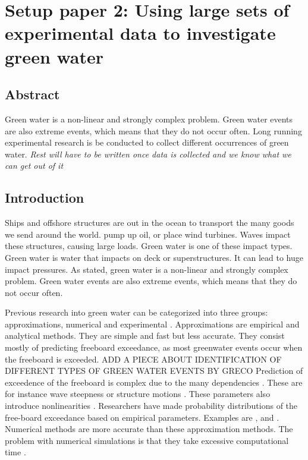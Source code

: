 \chapter{Setup paper 2: Using large sets of experimental data to investigate green water}
\label{sec:setup2}
\section*{Abstract}
Green water is a non-linear and strongly complex problem. Green water events are also extreme events, which means that they do not occur often. Long running experimental research is be conducted to collect different occurrences of green water. \textit{Rest will have to be written once data is collected and we know what we can get out of it}
\section{Introduction}
\label{sec:setup2_intro}
Ships and offshore structures are out in the ocean to transport the many goods we send around the world. pump up oil, or place wind turbines. Waves impact these structures, causing large loads. Green water is one of these impact types.
Green water is water that impacts on deck or superstructures. It can lead to huge impact pressures. As \citet{Buchner2002} stated, green water is a non-linear and strongly complex problem. Green water events are also extreme events, which means that they do not occur often. \par 
Previous research into green water can be categorized into three groups: approximations, numerical and experimental \cite{ISSC2012}. 
Approximations are empirical and analytical methods. They are simple and fast but less accurate. They consist mostly of predicting freeboard exceedance, as most greenwater events occur when the freeboard is exceeded. ADD A PIECE ABOUT IDENTIFICATION OF DIFFERENT TYPES OF GREEN WATER EVENTS BY GRECO
Prediction of exceedence of the freeboard is complex due to the many dependencies \cite{Lee2020}. These are for instance wave steepness or structure motions \cite{Greco2001,Buchner2002}. These parameters also introduce nonlinearities \cite{Faltinsen2002}. Researchers have made probability distributions of the free-board exceedance based on empirical parameters. Examples are \citet{Buchner2002}, \citet{Cox2001} and \citet{Soares2005}.
Numerical methods are more accurate than these approximation methods. The problem with numerical simulations is that they take excessive computational time \cite{Soares2015}.  
